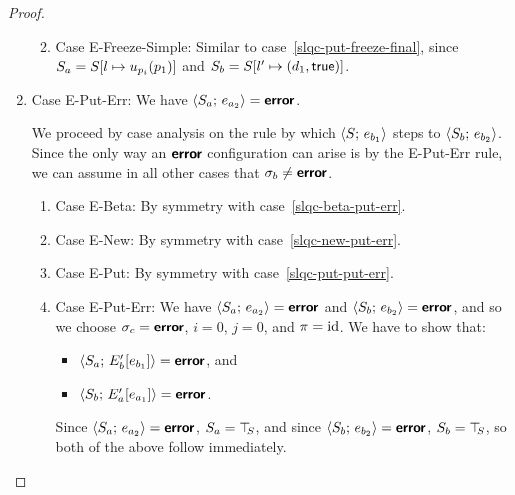\begin{proof}
\begin{enumerate}
\begin{enumerate}
\begin{itemize}
      \end{itemize}

    \item \label{slqc-put-freeze-simple}Case {\sc E-Freeze-Simple}:
      Similar to case~\ref{slqc-put-freeze-final}, since $S_a =
      S[l \mapsto u_{p_i}(p_1)]$ and $S_b =
      S[l' \mapsto (d_1, \textsf{true})]$.

    \end{enumerate}
  \item Case {\sc E-Put-Err}: We have $\langle S_a;\, e_{a_2} \rangle =
    \textbf{\textsf{error}}$.

    We proceed by case analysis on the rule by which
    $\langle S;\, e_{b_1} \rangle$ steps to $\langle S_b;\, e_{b_2} \rangle$.  Since the
    only way an $\textbf{\textsf{error}}$ configuration can arise is by the {\sc
      E-Put-Err} rule, we can assume in all other cases that $\sigma_b
    \neq \textbf{\textsf{error}}$.
    \begin{enumerate}
    \item \label{slqc-put-err-beta}Case {\sc E-Beta}: By symmetry with case~\ref{slqc-beta-put-err}.
    \item \label{slqc-put-err-new}Case {\sc E-New}: By symmetry with case~\ref{slqc-new-put-err}.
    \item \label{slqc-put-err-put}Case {\sc E-Put}: By symmetry with case~\ref{slqc-put-put-err}.
    \item \label{slqc-put-err-put-err}Case {\sc E-Put-Err}: We have
      $\langle S_a;\, e_{a_2} \rangle = \textbf{\textsf{error}}$ and $\langle S_b;\, e_{b_2} \rangle =
      \textbf{\textsf{error}}$, and so we choose $\sigma_c = \textbf{\textsf{error}}$, $i = 0$, $j = 0$,
      and $\pi = \mathrm{id}$.  We have to show that:
      \begin{itemize}
      \item $\langle S_a;\, E'_b\hspace{-0.5mm}\left[e_{b_1}\right] \rangle = \textbf{\textsf{error}}$, and
      \item $\langle S_b;\, E'_a\hspace{-0.5mm}\left[e_{a_1}\right] \rangle = \textbf{\textsf{error}}$.
      \end{itemize}

      Since $\langle S_a;\, e_{a_2} \rangle = \textbf{\textsf{error}}$, $S_a = \top\hspace{-0.85mm}_{S}$, and since
      $\langle S_b;\, e_{b_2} \rangle = \textbf{\textsf{error}}$, $S_b = \top\hspace{-0.85mm}_{S}$, so both of the
      above follow immediately.


\end{enumerate}
\end{enumerate}
\end{proof}
